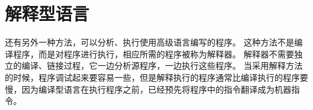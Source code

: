 \section{解释型语言}
{
    还有另外一种方法，可以分析、执行使用高级语言编写的程序。
    这种方法不是编译程序，而是对程序进行执行，相应所需的程序被称为解释器。
    解释器不需要独立的编译、链接过程，它一边分析源程序，一边执行这些程序。
    当采用解释方法的时候，程序调试起来要容易一些，但是解释执行的程序通常比编译执行的程序要慢，因为编译型语言在执行程序之前，已经预先将程序中的指令翻译成为机器指令。
}

\endinput
